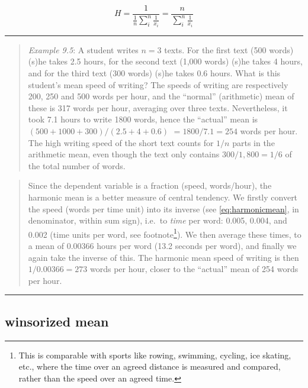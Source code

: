 \documentclass[
]{book}
\begin{document}
\begin{equation}
  H = \frac{1}{\frac{1}{n} \sum\limits_{i}^n \frac{1}{x_i} } = \frac{n}{\sum\limits_{i}^n \frac{1}{x_i}}
  \label{eq:harmonicmean}
\end{equation}

\begin{center}\rule{0.5\linewidth}{0.5pt}\end{center}

\begin{quote}
\emph{Example 9.5}:
A student writes \(n=3\) texts. For the first text (500 words) (s)he takes
2.5 hours, for the second text (1,000 words) (s)he takes 4 hours, and
for the third text (300 words) (s)he takes 0.6 hours. What is this student's
mean speed of writing?
The speeds of writing are respectively 200, 250 and 500
words per hour, and the ``normal'' (arithmetic) mean of these is
317 words per hour, averaging over three texts.
Nevertheless, it took 7.1 hours to write 1800 words, hence
the ``actual'' mean is
\((500+1000+300)/(2.5+4+0.6)\) \(=1800/7.1=254\) words per hour. The high
writing speed of the short text counts for \(1/n\) parts in the arithmetic mean, even though the text only contains \(300/1,800=1/6\) of the total number of words.
\end{quote}

\begin{quote}
Since the dependent variable is a fraction (speed, words/hour),
the harmonic mean is a better measure of central tendency. We firstly convert
the speed (words per time unit) into its inverse
(see \eqref{eq:harmonicmean}, in denominator, within sum sign),
i.e.~to \emph{time} per word: 0.005, 0.004, and 0.002 (time units per
word, see footnote\footnote{This is comparable with sports like rowing, swimming, cycling, ice skating, etc., where
  the time over an agreed distance is measured and compared, rather than the speed over an
  agreed time.}). We then average these times, to
a mean of 0.00366 hours per word (13.2 seconds per word), and finally we again take the
inverse of this. The harmonic mean speed of writing is then \(1/0.00366=273\)
words per hour, closer to the ``actual'' mean of 254 words per hour.
\end{quote}

\begin{center}\rule{0.5\linewidth}{0.5pt}\end{center}

\subsection{winsorized mean}\label{winsorized-mean}
\end{document}
